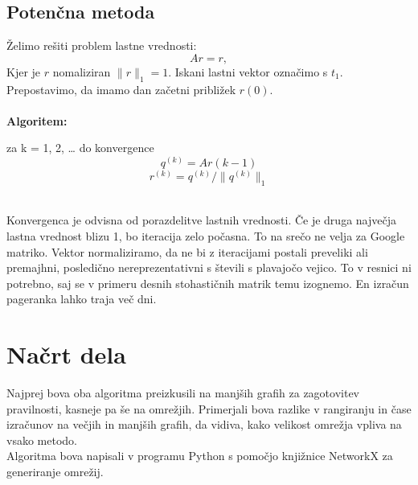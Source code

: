 \documentclass[a4paper]{article}
\begin{document}
\subsection{Potenčna metoda}
Želimo rešiti problem lastne vrednosti:
$$Ar = r,$$
Kjer je $r$ nomaliziran $\|r\|_1=1$. Iskani lastni vektor označimo s $t_1$. \\
Prepostavimo, da imamo dan začetni približek $r{(0)}$. \\
\\
\textbf{Algoritem:} \\
\begin{center} za k = 1, 2, … do konvergence
	$$q^{(k)} = Ar{(k-1)}$$ 
	$$r^{(k)} = q^{(k)}/ \|q^{(k)}\|_1$$ \\
\end{center}
Konvergenca je odvisna od porazdelitve lastnih vrednosti. Če je druga največja lastna vrednost blizu 1, bo iteracija zelo počasna. To na srečo ne velja za Google matriko. Vektor normaliziramo, da ne bi z iteracijami postali preveliki ali premajhni, posledično nereprezentativni s števili s plavajočo vejico. To v resnici ni potrebno, saj se v primeru desnih stohastičnih matrik temu izognemo. 
En izračun pageranka lahko traja več dni.

\section{Načrt dela}
\hspace{4.8mm}Najprej bova oba algoritma preizkusili na manjših grafih za zagotovitev pravilnosti, kasneje pa še na omrežjih. Primerjali bova razlike v rangiranju in čase izračunov na večjih in manjših grafih, da vidiva, kako velikost omrežja vpliva na vsako metodo. \\
Algoritma bova napisali v programu Python s pomočjo knjižnice NetworkX za generiranje omrežij. 
\end{document}
